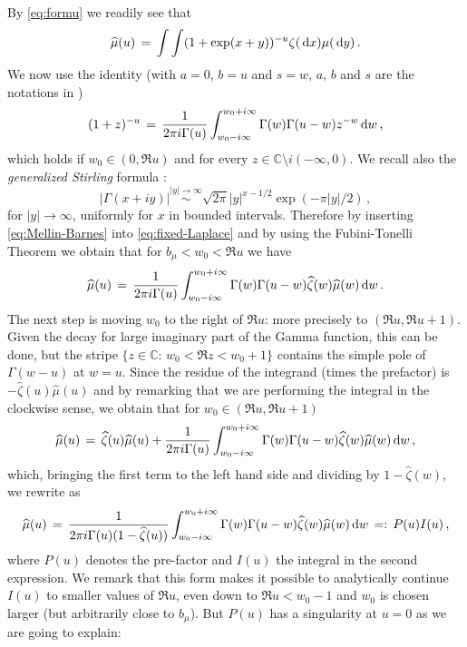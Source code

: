\documentclass[reqno,11pt]{amsart}
\numberwithin{equation}{section}
\newcommand{\dd}{\,\text{\rm d}}             %
\newcommand{\bbC}{{\ensuremath{\mathbb C}} }
\newcommand{\gz}{\zeta}
\newcommand{\gG}{\Gamma}
\begin{document}
 By 
\eqref{eq:formu} we readily see that 
\begin{equation}
\label{eq:fixed-Laplace}
\widehat \mu (u)\, =\, 
 \int \int (1+\exp(x+y))^{-u} \gz(\dd x) \mu ( \dd y)\,.
\end{equation}
We now use the identity \cite[(5.13.1)]{cf:DLMF}  (with $a=0$, $b=u$ and $s=w$, $a$, $b$ and $s$ are the notations in \cite{cf:DLMF})
\begin{equation}
\label{eq:Mellin-Barnes}
(1+z)^{-u}\, =\, \frac 1{ 2\pi i \gG(u)} \int_{w_0-i\infty}^{w_0 + i \infty} \gG (w) \gG(u-w) z^{-w} \dd w\,,
\end{equation}
which holds if  $w_0\in (0, \Re u)$ and  for every $z\in \bbC \setminus i(-\infty,0)$. We recall also the \emph{generalized  Stirling} formula \cite[(5.11.9)]{cf:DLMF}:
\begin{equation} 
\label{eq:5119}
\vert \gG(x+iy)\vert \stackrel {\vert y \vert \to \infty}\sim  \sqrt{2 \pi} \vert y \vert ^{x-1/2} \exp(-\pi \vert y \vert /2)\, ,
\end{equation}
for $\vert y \vert \to \infty$, uniformly for $x$ in bounded intervals.
Therefore by 
inserting \eqref{eq:Mellin-Barnes} into \eqref{eq:fixed-Laplace} and by using 
the  Fubini-Tonelli Theorem we obtain that for $b_\mu< w_0 < \Re u$  we have
\begin{equation}
\widehat \mu (u)\, =\, \frac{ 1}{2\pi i \gG(u)} 
 \int_{w_0-i\infty}^{w_0 + i \infty} \gG (w) \gG(u-w) \widehat \gz(w) \widehat \mu (w) \dd w\,.
\end{equation}
The next step is moving $w_0$ to the right of $\Re u$: more precisely to $(\Re u,\Re u+1)$. Given the decay for large imaginary part of the Gamma function, this can be done, but the stripe $\{z\in \bbC:\, w_0<\Re z <w_0+1\}$ contains
the simple pole of $\Gamma(w-u)$ at $w=u$. Since the residue of the integrand (times the prefactor) is 
$-\widehat \gz(u) \widehat \mu (u)$ and by remarking that we are performing the integral in the clockwise sense,  we obtain that for $w_0\in (\Re u,\Re u +1)$ 
\begin{equation}
\widehat \mu (u)\, =\, \widehat \gz(u) \widehat \mu (u) + \frac{ 1}{2\pi i \gG(u)} 
 \int_{w_0-i\infty}^{w_0 + i \infty} \gG (w) \gG(u-w) \widehat \gz(w)\widehat \mu (w) \dd w\,, 
\end{equation}
which, bringing the first term to the left hand side and dividing by $1-\widehat \zeta(w)$, we rewrite as
\begin{equation}
\label{eq:nuu}
\widehat \mu (u)\, =\, \frac{1}{2\pi i \gG(u)(1-\widehat \gz(u))} 
 \int_{w_0-i\infty}^{w_0 + i \infty} \gG (w) \gG(u-w)  \widehat \gz(w)\widehat \mu (w) \dd w\, =:\, P(u) I(u)\, ,
\end{equation}
where $P(u)$ denotes the pre-factor and $I(u)$ the integral in the second expression. 
We remark that this form makes it possible to analytically continue $I (u)$ to smaller values of $\Re u$, 
even down to $\Re u < w_0-1$ and $w_0$ is chosen larger (but arbitrarily close to $b_\mu$). 
But $P(u)$ has a singularity at  $u=0$ as we are going to explain:
\smallskip
\end{document}
